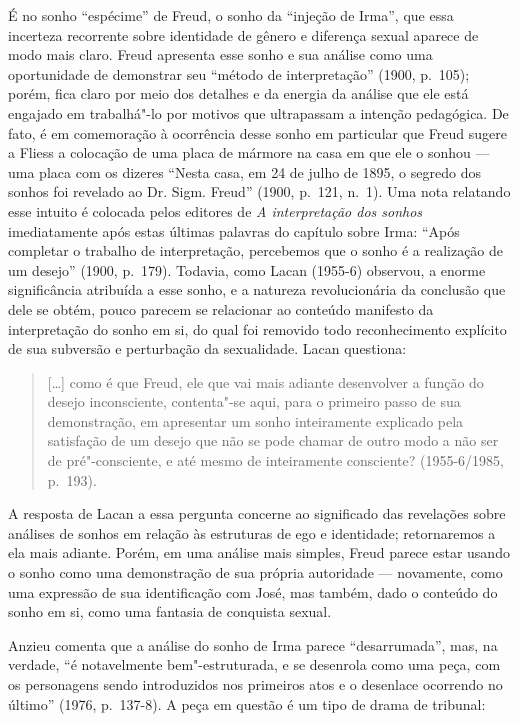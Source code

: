 É no sonho ``espécime'' de Freud, o sonho da ``injeção de Irma'', que
essa incerteza recorrente sobre identidade de gênero e diferença sexual
aparece de modo mais claro. Freud apresenta esse sonho e sua análise
como uma oportunidade de demonstrar seu ``método de interpretação''
(1900, p.~105); porém, fica claro por meio dos detalhes e da
energia da análise que ele está engajado em trabalhá"-lo por motivos que
ultrapassam a intenção pedagógica. De fato, é em comemoração à
ocorrência desse sonho em particular que Freud sugere a Fliess a
colocação de uma placa de mármore na casa em que ele o sonhou --- uma
placa com os dizeres ``Nesta casa, em 24 de julho de 1895, o segredo dos
sonhos foi revelado ao Dr. Sigm. Freud'' (1900, p.~121, n.~1). Uma nota
relatando esse intuito é colocada pelos editores de \emph{A
interpretação dos sonhos} imediatamente após estas últimas palavras do
capítulo sobre Irma: ``Após completar o trabalho de interpretação,
percebemos que o sonho é a realização de um desejo'' (1900, p.~179). Todavia,
como Lacan (1955-6) observou, a enorme significância atribuída a esse
sonho, e a natureza revolucionária da conclusão que dele se obtém, pouco
parecem se relacionar ao conteúdo manifesto da interpretação do sonho em
si, do qual foi removido todo reconhecimento explícito de sua subversão
e perturbação da sexualidade. Lacan questiona:

\begin{quote}
{[}\ldots{}{]} como é que Freud, ele que vai mais adiante desenvolver a
função do desejo inconsciente, contenta"-se aqui, para o primeiro passo
de sua demonstração, em apresentar um sonho inteiramente explicado pela
satisfação de um desejo que não se pode chamar de outro modo a não ser
de pré"-consciente, e até mesmo de inteiramente consciente? (1955-6/1985, p.~193).
\end{quote}

A resposta de Lacan a essa pergunta concerne ao significado das
revelações sobre análises de sonhos em relação às estruturas de ego e
identidade; retornaremos a ela mais adiante. Porém, em uma análise mais
simples, Freud parece estar usando o sonho como uma demonstração de sua
própria autoridade --- novamente, como uma expressão de sua identificação
com José, mas também, dado o conteúdo do sonho em si, como uma fantasia
de conquista sexual.

Anzieu comenta que a análise do sonho de Irma parece ``desarrumada'',
mas, na verdade, ``é notavelmente bem"-estruturada, e se desenrola como
uma peça, com os personagens sendo introduzidos nos primeiros atos e o
desenlace ocorrendo no último'' (1976, p.~137-8). A peça em questão é
um tipo de drama de tribunal:


